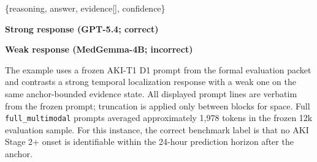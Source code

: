 \documentclass[pdflatex,sn-nature]{sn-jnl}
\begin{document}
\begin{center}
\begin{minipage}[t]{0.48\textwidth}
{{\{reasoning, answer, evidence[], confidence\}
}}
\end{minipage}\hfill
\begin{minipage}[t]{0.49\textwidth}
\textbf{Strong response (GPT-5.4; correct)}\par
\vspace{4pt}
\par
\vspace{8pt}
\textbf{Weak response (MedGemma-4B; incorrect)}\par
\vspace{4pt}
\end{minipage}
\par\vspace{4pt}
\parbox{0.96\textwidth}{\footnotesize The example uses a frozen AKI-T1 D1 prompt from the formal evaluation packet and contrasts a strong temporal localization response with a weak one on the same anchor-bounded evidence state. All displayed prompt lines are verbatim from the frozen prompt; truncation is applied only between blocks for space. Full \texttt{full\_multimodal} prompts averaged approximately 1,978 tokens in the frozen 12k evaluation sample. For this instance, the correct benchmark label is that no AKI Stage 2+ onset is identifiable within the 24-hour prediction horizon after the anchor.}
\end{center}
\end{document}
